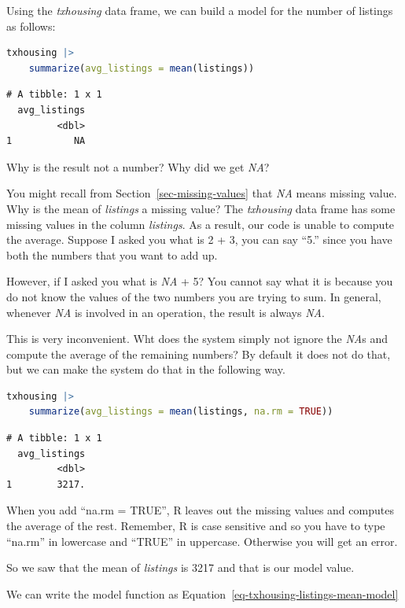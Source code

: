 \documentclass[
  12pt,
  letterpaper,
  DIV=11,
  numbers=noendperiod]{scrreprt}
\begin{document}
Using the \emph{txhousing} data frame, we can build a model for the
number of listings as follows:

\begin{lstlisting}[language=R]
txhousing |>
    summarize(avg_listings = mean(listings))
\end{lstlisting}

\begin{lstlisting}
# A tibble: 1 x 1
  avg_listings
         <dbl>
1           NA
\end{lstlisting}

Why is the result not a number? Why did we get \emph{NA}?

You might recall from Section~\ref{sec-missing-values} that \emph{NA}
means missing value. Why is the mean of \emph{listings} a missing value?
The \emph{txhousing} data frame has some missing values in the column
\emph{listings}. As a result, our code is unable to compute the average.
Suppose I asked you what is 2 + 3, you can say ``5.'' since you have
both the numbers that you want to add up.

However, if I asked you what is \emph{NA} + 5? You cannot say what it is
because you do not know the values of the two numbers you are trying to
sum. In general, whenever \emph{NA} is involved in an operation, the
result is always \emph{NA}.

This is very inconvenient. Wht does the system simply not ignore the
\emph{NA}s and compute the average of the remaining numbers? By default
it does not do that, but we can make the system do that in the following
way.

\begin{lstlisting}[language=R]
txhousing |>
    summarize(avg_listings = mean(listings, na.rm = TRUE))
\end{lstlisting}

\begin{lstlisting}
# A tibble: 1 x 1
  avg_listings
         <dbl>
1        3217.
\end{lstlisting}

When you add ``na.rm = TRUE'', R leaves out the missing values and
computes the average of the rest. Remember, R is case sensitive and so
you have to type ``na.rm'' in lowercase and ``TRUE'' in uppercase.
Otherwise you will get an error.

So we saw that the mean of \emph{listings} is 3217 and that is our model
value.

We can write the model function as
Equation~\ref{eq-txhousing-listings-mean-model}
\end{document}
